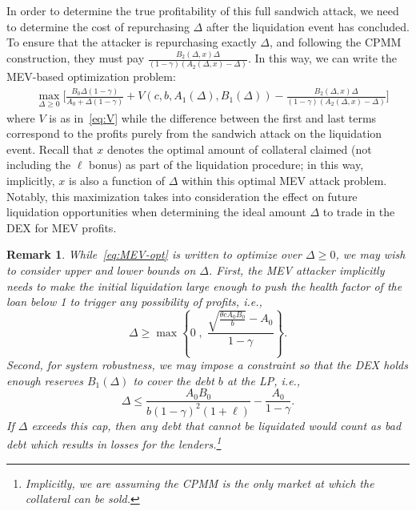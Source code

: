 \documentclass[11pt]{article} %
\newtheorem{remark}{Remark}
\begin{document}
In order to determine the true profitability of this full sandwich attack, we need to determine the cost of repurchasing $\Delta$ after the liquidation event has concluded. To ensure that the attacker is repurchasing exactly $\Delta$, and following the CPMM construction, they must pay $\frac{B_2(\Delta,x)\Delta}{(1-\gamma)(A_2(\Delta,x)-\Delta)}$.
In this way, we can write the MEV-based optimization problem:
%
\begin{align}
\label{eq:MEV-opt} &\max_{\Delta\geq 0}\bigg[\frac{B_0\Delta(1-\gamma)}{A_0+\Delta(1-\gamma)} + V(c,b,A_1(\Delta),B_1(\Delta)) - \frac{B_2(\Delta,x)\Delta}{(1-\gamma)(A_2(\Delta,x)-\Delta)}\bigg]
\end{align}
%
where $V$ is as in~\eqref{eq:V} while the difference between the first and last terms correspond to the profits purely from the sandwich attack on the liquidation event. Recall that $x$ denotes the optimal amount of collateral claimed (not including the $\ell$ bonus) as part of the liquidation procedure; in this way, implicitly, $x$ is also a function of $\Delta$ within this optimal MEV attack problem.
Notably, this maximization takes into consideration the effect on future liquidation opportunities when determining the ideal amount $\Delta$ to trade in the DEX for MEV profits.
\begin{remark}
While~\eqref{eq:MEV-opt} is written to optimize over $\Delta \geq 0$, we may wish to consider upper and lower bounds on $\Delta$.
First, the MEV attacker implicitly needs to make the initial liquidation large enough to push the health factor of the loan below 1 to trigger any possibility of profits, i.e.,
\[\Delta \geq \max\left\{0 \; , \;  \frac{\sqrt{\frac{\theta c A_0 B_0}{b}}-A_0}{1-\gamma}\right\}.\]
Second, for system robustness, we may impose a constraint so that the DEX holds enough reserves $B_1(\Delta)$ to cover the debt $b$ at the LP, i.e.,
\[\Delta\leq \frac{A_0B_0}{b(1-\gamma)^2(1+\ell)}-\frac{A_0}{1-\gamma}.\]
If $\Delta$ exceeds this cap, then any debt that cannot be liquidated would count as \emph{bad debt} which results in losses for the lenders.\footnote{Implicitly, we are assuming the CPMM is the only market at which the collateral can be sold.}
\end{remark}
\end{document}
